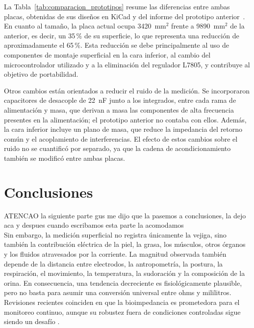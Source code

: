\documentclass[12pt,a4paper]{article}
\begin{document}
La Tabla~\ref{tab:comparacion_prototipos} resume las diferencias entre ambas placas, obtenidas de
sus diseños en KiCad y del informe del prototipo anterior~\cite{informe_grupo2_2025}. En cuanto al
tamaño, la placa actual ocupa 3420~mm$^2$ frente a 9890~mm$^2$ de la anterior, es decir, un 35\,\% de
su superficie, lo que representa una reducción de aproximadamente el 65\,\%. Esta reducción se debe
principalmente al uso de componentes de montaje superficial en la cara inferior, al cambio del microcontrolador 
utilizado y a la eliminación del regulador L7805, y contribuye al objetivo de portabilidad.

Otros cambios están orientados a reducir el ruido de la medición. Se incorporaron capacitores de
desacople de 22~nF junto a los integrados, entre cada rama de alimentación y masa, que derivan a masa
las componentes de alta frecuencia presentes en la alimentación; el prototipo anterior no contaba con
ellos. Además, la cara inferior incluye un plano de masa, que reduce la impedancia del retorno común y
el acoplamiento de interferencias. El efecto de estos cambios sobre el ruido no se cuantificó por
separado, ya que la cadena de acondicionamiento también se modificó entre ambas placas.






\section{Conclusiones}

ATENCAO la siguiente parte gus me dijo que la pasemos a conclusiones, la dejo aca y despues cuando escribamos esta parte la acomodamos
\\
Sin embargo, la medición superficial no registra únicamente la vejiga, sino también la contribución
eléctrica de la piel, la grasa, los músculos, otros órganos y los fluidos atravesados por la corriente.
La magnitud observada también depende de la distancia entre electrodos, la antropometría, la postura,
la respiración, el movimiento, la temperatura, la sudoración y la composición de la orina. En
consecuencia, una tendencia decreciente es fisiológicamente plausible, pero no basta para asumir una
conversión universal entre ohms y mililitros. Revisiones recientes coinciden en que la bioimpedancia
es prometedora para el monitoreo continuo, aunque su robustez fuera de condiciones controladas sigue
siendo un desafío \cite{li2013monitoring,palla2023review,noyori2022review}.


\printbibliography
\end{document}
